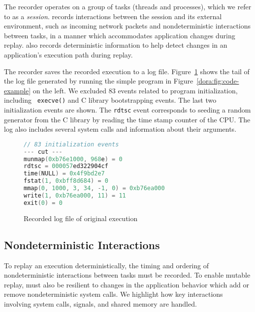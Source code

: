 The recorder operates on a group of tasks (threads and processes), which we
refer to as a {\em session}. {\dora} records interactions between the
session and its external environment, such as incoming network packets and
nondeterministic interactions between tasks, in a manner which accommodates
application changes during replay. {\dora} also records deterministic
information to help detect changes in an application's execution path during
replay.

The recorder saves the recorded execution to a log file.
Figure~\ref{dora:fig:example-orig-log} shows the
tail of the log file generated by running the simple program in
Figure~\ref{dora:fig:code-example} on the left.
We excluded 83 events related to program initialization, including {\tt
execve()} and C library bootstrapping events. The last two initialization events
are shown. The {\tt rdtsc} event corresponds to seeding a random generator from the C library
by reading the time stamp counter of the CPU. The log also includes
several system calls and information about their arguments.

\begin{figure}
\centering
\begin{minipage}{.56\textwidth}
\small
\begin{lstlisting}[framexleftmargin=5pt,language=C,basicstyle=\ttfamily]
// 83 initialization events
--- cut ---
munmap(0xb76e1000, 968e) = 0
rdtsc = 000057ed322904cf
time(NULL) = 0x4f9bd2e7
fstat(1, 0xbff8d684) = 0
mmap(0, 1000, 3, 34, -1, 0) = 0xb76ea000
write(1, 0xb76ea000, 11) = 11
exit(0) = 0
\end{lstlisting}
\end{minipage}
\caption{Recorded log file of original execution}
\label{dora:fig:example-orig-log}
\end{figure}

\subsection{Nondeterministic Interactions}
To replay an execution deterministically, the timing and ordering of
nondeterministic interactions between tasks must be recorded.  To
enable mutable replay, {\dora} must also be resilient to changes in
the application behavior which add or remove nondeterministic system calls. We
highlight how key interactions involving system calls, signals, and shared
memory are handled.

